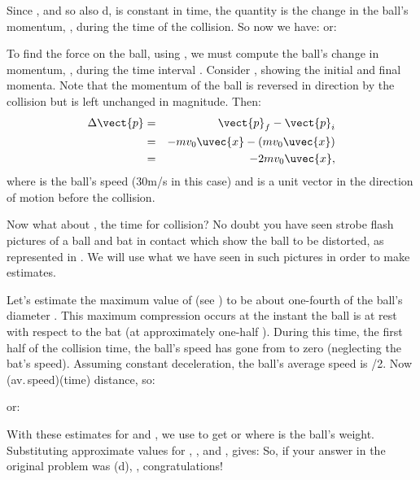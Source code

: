 {Since , and so also d, is constant in time, the quantity
 is
the change in the ball's momentum, , during the time of the
collision.
So now we have:
%
%
or:
%
%

To find the force on the ball, using , we
must compute the ball's change in momentum, , during the time
interval .
Consider , showing the initial and final momenta.
Note that the momentum of the ball is reversed in direction by the collision
but is left unchanged in magnitude.
Then:
\begin{eqnarray*}
\Delta \vect{p} & = & \vect{p}_f - \vect{p}_i \\
               & = & - m v_0 \uvec{x} - (m v_0 \uvec{x}) \\
               & = & - 2 m v_0 \uvec{x},
\end{eqnarray*}
where  is the ball's speed (30\unit{m/s} in this case) and  is a unit
vector in the direction of motion before the collision.

Now what about , the time for collision?
No doubt you have seen strobe flash pictures
%
%
of a ball and bat in contact which show the ball to be distorted, as
represented in .
We will use what we have seen in such pictures in order to make estimates.


Let's estimate the maximum value of  (see ) to be about one-fourth
of the ball's diameter .
This maximum compression occurs at the instant the ball is at rest with
respect to the bat (at approximately one-half ).
During this time, the first half of the collision time, the ball's speed has
gone from  to zero (neglecting the bat's speed).
Assuming constant deceleration, the ball's average speed is /2.
Now (av.\,speed)\m{\cdot}(time)\,\m{\simeq}\,distance, so:
\begin{center}
\end{center}
or:
\begin{center}
\end{center}
With these estimates for  and , we use  to
get
%
%
or
%
%
where  is the ball's weight.
Substituting approximate values for ,
, and ,
gives:
%
%
So, if your answer in the original problem was (d), , congratulations!

}
